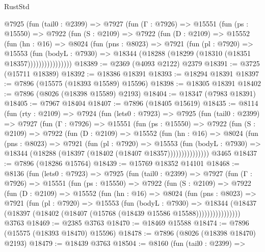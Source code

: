 \begin{lexlean}{RustStd}
\begin{coremodule}
        @7925
          (fun (tail0 : @2399) =>
          @7927
            (fun (Γ : @7926) =>
            @15551
              (fun (ps : @15550) =>
              @7922
                (fun (S : @2109) =>
                @7922
                  (fun (D : @2109) =>
                  @15552
                    (fun (hn : @16) =>
                    @8024
                      (fun (pns : @8023) =>
                      @7921
                        (fun (pl : @7920) =>
                        @15553
                          (fun (bodyL : @7930) =>
                          @18344 (@18288 (@18299 (@18310 (@18351 @18357))))))))))))))))
@18389 := @2369 (@4093 @2122) @2379
@18391 := @3725 (@15711 @18389)
@18392 := @18386 @18391
@18393 := @18294 @18391
@18397 := @7896 (@15575 (@18393 @15589) @15596)
@18398 := @18305 @18391
@18402 := @7896 (@8026 (@18398 @15589) @2193)
@18404 := @18347 (@7983 @18391)
@18405 := @7967 @18404
@18407 := @7896 (@18405 @15619)
@18435 := @8114
    (fun (rty : @2109) =>
    @7924
      (fun (lets0 : @7923) =>
      @7925
        (fun (tail0 : @2399) =>
        @7927
          (fun (Γ : @7926) =>
          @15551
            (fun (ps : @15550) =>
            @7922
              (fun (S : @2109) =>
              @7922
                (fun (D : @2109) =>
                @15552
                  (fun (hn : @16) =>
                  @8024
                    (fun (pns : @8023) =>
                    @7921
                      (fun (pl : @7920) =>
                      @15553
                        (fun (bodyL : @7930) =>
                        @18344 (@18288 (@18397 (@18402 (@18407 @18357)))))))))))))))
    @3465
@18437 := @7896 (@18286 @15764)
@18439 := @15769 @18352 @14101
@18468 := @8136
    (fun (lets0 : @7923) =>
    @7925
      (fun (tail0 : @2399) =>
      @7927
        (fun (Γ : @7926) =>
        @15551
          (fun (ps : @15550) =>
          @7922
            (fun (S : @2109) =>
            @7922
              (fun (D : @2109) =>
              @15552
                (fun (hn : @16) =>
                @8024
                  (fun (pns : @8023) =>
                  @7921
                    (fun (pl : @7920) =>
                    @15553
                      (fun (bodyL : @7930) =>
                      @18344
                        (@18437
                          (@18397 (@18402 (@18407 (@15768 (@18439 @15586 @15588))))))))))))))))
    @3763
@18469 := @2385 @3763
@18470 := @18469 @15588
@18474 := @7896 (@15575 (@18393 @18470) @15596)
@18478 := @7896 (@8026 (@18398 @18470) @2193)
@18479 := @18439 @3763
@18504 := @8160
    (fun (tail0 : @2399) =>

\end{coremodule}
\end{lexlean}
